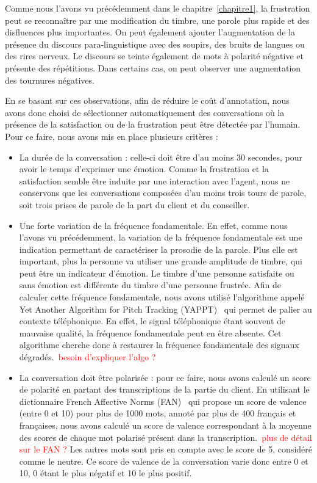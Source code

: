 Comme nous l'avons vu précédemment dans le chapitre~\ref{chapitre1}, la frustration peut se reconnaître par une modification du timbre, une parole plus rapide et des disfluences plus importantes. On peut également ajouter l'augmentation de la présence du discours para-linguistique avec des soupirs, des bruits de langues ou des rires nerveux. Le discours se teinte également de mots à polarité négative et présente des répétitions. Dans certains cas, on peut observer une augmentation des tournures négatives.

En se basant sur ces observations, afin de réduire le coût d'annotation, nous avons donc choisi de sélectionner automatiquement des conversations où la présence de la satisfaction ou de la frustration peut être détectée par l'humain. Pour ce faire, nous avons mis en place plusieurs critères :
\begin{itemize}
  \item La durée de la conversation : celle-ci doit être d'au moins 30 secondes, pour avoir le temps d'exprimer une émotion. Comme la frustration et la satisfaction semble être induite par une interaction avec l'agent, nous ne conservons que les conversations composées d'au moins trois tours de parole, soit trois prises de parole de la part du client et du conseiller.
  \item Une forte variation de la fréquence fondamentale. En effet, comme nous l'avons vu précédemment, la variation de la fréquence fondamentale est une indication permettant de caractériser la prosodie de la parole. Plus elle est important, plus la personne va utiliser une grande amplitude de timbre, qui peut être un indicateur d'émotion. Le timbre d'une personne satisfaite ou sans émotion est différente du timbre d'une personne frustrée. Afin de calculer cette fréquence fondamentale, nous avons utilisé l'algorithme appelé Yet Another Algorithm for Pitch Tracking (YAPPT)~\cite{Zahorian2008} qui permet de palier au contexte téléphonique. En effet, le signal téléphonique étant souvent de mauvaise qualité, la fréquence fondamentale peut en être absente. Cet algorithme cherche donc à restaurer la fréquence fondamentale des signaux dégradés.~\textcolor{red}{besoin d'expliquer l'algo ?}
  \item La conversation doit être polarisée : pour ce faire, nous avons calculé un score de polarité en partant des transcriptions de la partie du client. En utilisant le dictionnaire French Affective Norms (FAN)~\cite{Monnier2014} qui propose un score de valence (entre 0 et 10) pour plus de 1000 mots, annoté par plus de 400 français et françaises, nous avons calculé un score de valence correspondant à la moyenne des scores de chaque mot polarisé présent dans la transcription.~\textcolor{red}{plus de détail sur le FAN ?} Les autres mots sont pris en compte avec le score de 5, considéré comme le neutre. Ce score de valence de la conversation varie donc entre 0 et 10, 0 étant le plus négatif et 10 le plus positif.
\end{itemize}

